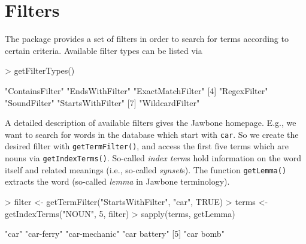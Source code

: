 \documentclass[a4paper]{article}
\newcommand{\code}[1]{\mbox{\texttt{#1}}}
\newcommand{\proglang}[1]{\textsf{#1}}
\begin{document}
\section*{Filters}
The package provides a set of filters in order to search for terms
according to certain criteria. Available filter types can be listed via
\begin{Schunk}
\begin{Sinput}
> getFilterTypes()
\end{Sinput}
\begin{Soutput}
[1] "ContainsFilter"   "EndsWithFilter"   "ExactMatchFilter"
[4] "RegexFilter"      "SoundFilter"      "StartsWithFilter"
[7] "WildcardFilter"  
\end{Soutput}
\end{Schunk}
A detailed description of available
filters gives the \proglang{Jawbone} homepage. E.g., we want to search
for words in the database which start with \code{car}. So we create
the desired filter with \code{getTermFilter()}, and access the first
five terms which are nouns via \code{getIndexTerms()}. So-called \emph{index
term}s hold information on the word itself and related meanings (i.e.,
so-called \emph{synset}s). The function \code{getLemma()} extracts the
word (so-called \emph{lemma} in \proglang{Jawbone} terminology).
\begin{Schunk}
\begin{Sinput}
> filter <- getTermFilter("StartsWithFilter", "car", TRUE)
> terms <- getIndexTerms("NOUN", 5, filter)
> sapply(terms, getLemma)
\end{Sinput}
\end{Schunk}
\begin{Soutput}
[1] "car"      "car-ferry"     "car-mechanic"     "car battery"
[5] "car bomb"
\end{Soutput}
\end{document}
